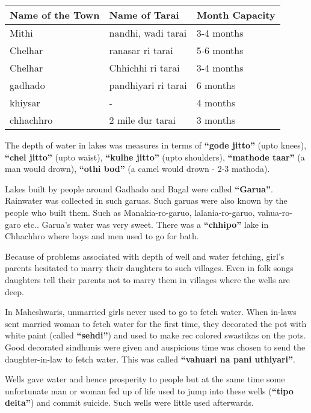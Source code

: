 \begin{center}
\begin{tabular}{l|l|l}
\hline
\textbf{Name of the Town} & \textbf{Name of Tarai} & \textbf{Month Capacity} \\
\hline
Mithi & nandhi, wadi tarai & 3-4 months \\ 
Chelhar & ranasar ri tarai & 5-6 months \\ 
Chelhar & Chhichhi ri tarai & 3-4 months \\ 
gadhado & pandhiyari ri tarai & 6 months \\ 
khiysar & - & 4 months \\ 
chhachhro & 2 mile dur tarai & 3 months \\ 
\hline
\end{tabular}
\end{center}

The depth of water in lakes was measures in terms of \textbf{``gode jitto''}
(upto knees), \textbf{``chel jitto''} (upto waist), \textbf{``kulhe jitto''}
(upto shoulders), \textbf{``mathode taar''} (a man would drown), \textbf{``othi
bod''} (a camel would drown - 2-3 mathoda).

Lakes built by people around Gadhado and Bagal were called \textbf{``Garua''}.
Rainwater was collected in such garuas. Such garuas were also known by the
people who built them. Such as Manakia-ro-garuo, lalania-ro-garuo, vahua-ro-garo
etc.. Garua's water was very sweet. There was a \textbf{``chhipo''} lake in
Chhachhro where boys and men used to go for bath.

Because of problems associated with depth of well and water fetching, girl's
parents hesitated to marry their daughters to such villages. Even in folk songs
daughters tell their parents not to marry them in villages where the wells are
deep.

In Maheshwaris, unmarried girls never used to go to fetch water. When in-laws
sent married woman to fetch water for the first time, they decorated the pot
with white paint (called \textbf{``sehdi''}) and used to make rec colored
swastikas on the pots. Good decorated sindhunis were given and auspicious time
was chosen to send the daughter-in-law to fetch water. This was called
\textbf{``vahuari na pani uthiyari''}.

Wells gave water and hence prosperity to people but at the same time some
unfortunate man or woman fed up of life used to jump into these wells
(\textbf{``tipo deita''}) and commit suicide. Such wells were little used
afterwards.
